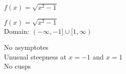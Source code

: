 {$f(x) = \sqrt{x^2-1}$}
{$f(x) = \sqrt{x^2-1}$\\
Domain: $(-\infty, -1] \cup [1,\infty)$\\
\begin{center}
\end{center}

No asymptotes\\
Unusual steepness at $x = -1$ and $x = 1$\\
No cusps\\

\begin{center}
\end{center}}